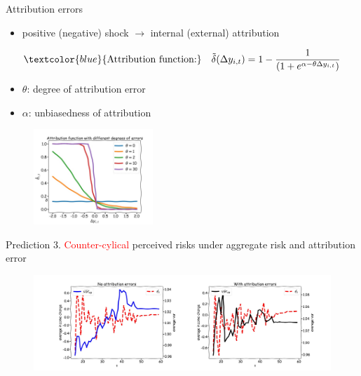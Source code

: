 \documentclass{beamer}
\begin{document}
\begin{frame}{Attribution errors}
	\begin{itemize}
		\item positive (negative) shock $\rightarrow$ internal (external) attribution
	\end{itemize}
	\begin{eqnarray}
\begin{split}
\textcolor{blue}{\text{Attribution function:}} \quad \tilde \delta(\Delta y_{i,t}) = 1- \frac{1}{(1+e^{\alpha-\theta\Delta y_{i,t}})}
\end{split}
\end{eqnarray}
	\begin{itemize}
	\item $\theta$: degree of attribution error
	\item $\alpha$: unbiasedness of attribution
\end{itemize}

	
	\begin{figure}
		\centering 
		\label{var_experience_var}
		\includegraphics[width=0.4\textwidth]{figures/theta_corr.jpg}
	\end{figure}
\end{frame}


\begin{frame}{Prediction 3. \textcolor{red}{Counter-cylical} perceived risks under aggregate risk and attribution error}
	\begin{figure}
		\centering 
		\label{var_experience_var}
		\includegraphics[width=\textwidth]{figures/var_recent_change_sim.jpg}
	\end{figure}
\end{frame}
\end{document}
